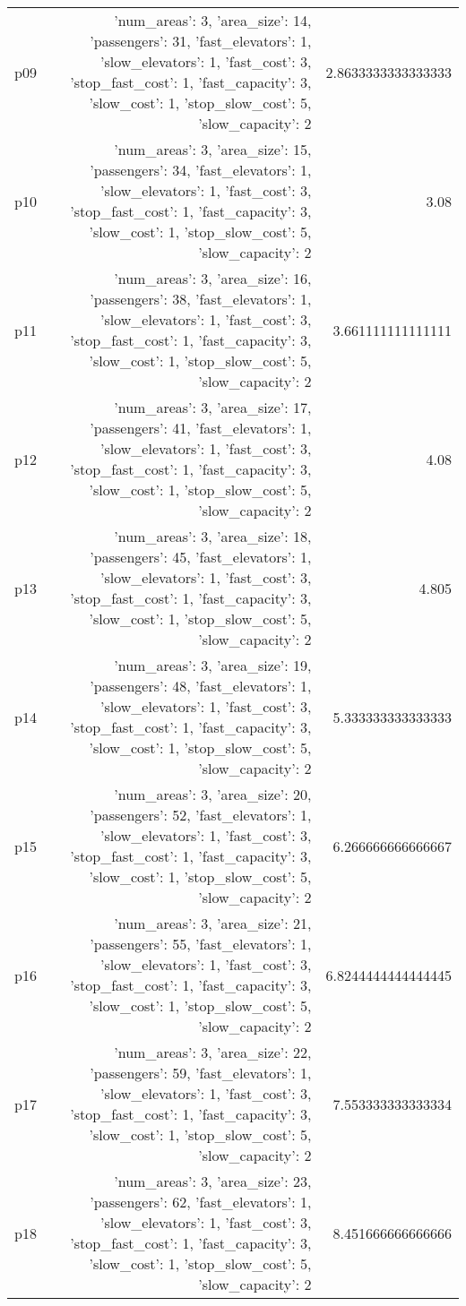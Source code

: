 \documentclass{article}
\begin{document}
\begin{center}
\begin{tabular}{r|r|r}
  p09&{'num\_areas': 3, 'area\_size': 14, 'passengers': 31, 'fast\_elevators': 1, 'slow\_elevators': 1, 'fast\_cost': 3, 'stop\_fast\_cost': 1, 'fast\_capacity': 3, 'slow\_cost': 1, 'stop\_slow\_cost': 5, 'slow\_capacity': 2}&2.8633333333333333\\
  p10&{'num\_areas': 3, 'area\_size': 15, 'passengers': 34, 'fast\_elevators': 1, 'slow\_elevators': 1, 'fast\_cost': 3, 'stop\_fast\_cost': 1, 'fast\_capacity': 3, 'slow\_cost': 1, 'stop\_slow\_cost': 5, 'slow\_capacity': 2}&3.08\\
  p11&{'num\_areas': 3, 'area\_size': 16, 'passengers': 38, 'fast\_elevators': 1, 'slow\_elevators': 1, 'fast\_cost': 3, 'stop\_fast\_cost': 1, 'fast\_capacity': 3, 'slow\_cost': 1, 'stop\_slow\_cost': 5, 'slow\_capacity': 2}&3.661111111111111\\
  p12&{'num\_areas': 3, 'area\_size': 17, 'passengers': 41, 'fast\_elevators': 1, 'slow\_elevators': 1, 'fast\_cost': 3, 'stop\_fast\_cost': 1, 'fast\_capacity': 3, 'slow\_cost': 1, 'stop\_slow\_cost': 5, 'slow\_capacity': 2}&4.08\\
  p13&{'num\_areas': 3, 'area\_size': 18, 'passengers': 45, 'fast\_elevators': 1, 'slow\_elevators': 1, 'fast\_cost': 3, 'stop\_fast\_cost': 1, 'fast\_capacity': 3, 'slow\_cost': 1, 'stop\_slow\_cost': 5, 'slow\_capacity': 2}&4.805\\
  p14&{'num\_areas': 3, 'area\_size': 19, 'passengers': 48, 'fast\_elevators': 1, 'slow\_elevators': 1, 'fast\_cost': 3, 'stop\_fast\_cost': 1, 'fast\_capacity': 3, 'slow\_cost': 1, 'stop\_slow\_cost': 5, 'slow\_capacity': 2}&5.333333333333333\\
  p15&{'num\_areas': 3, 'area\_size': 20, 'passengers': 52, 'fast\_elevators': 1, 'slow\_elevators': 1, 'fast\_cost': 3, 'stop\_fast\_cost': 1, 'fast\_capacity': 3, 'slow\_cost': 1, 'stop\_slow\_cost': 5, 'slow\_capacity': 2}&6.266666666666667\\
  p16&{'num\_areas': 3, 'area\_size': 21, 'passengers': 55, 'fast\_elevators': 1, 'slow\_elevators': 1, 'fast\_cost': 3, 'stop\_fast\_cost': 1, 'fast\_capacity': 3, 'slow\_cost': 1, 'stop\_slow\_cost': 5, 'slow\_capacity': 2}&6.8244444444444445\\
  p17&{'num\_areas': 3, 'area\_size': 22, 'passengers': 59, 'fast\_elevators': 1, 'slow\_elevators': 1, 'fast\_cost': 3, 'stop\_fast\_cost': 1, 'fast\_capacity': 3, 'slow\_cost': 1, 'stop\_slow\_cost': 5, 'slow\_capacity': 2}&7.553333333333334\\
  p18&{'num\_areas': 3, 'area\_size': 23, 'passengers': 62, 'fast\_elevators': 1, 'slow\_elevators': 1, 'fast\_cost': 3, 'stop\_fast\_cost': 1, 'fast\_capacity': 3, 'slow\_cost': 1, 'stop\_slow\_cost': 5, 'slow\_capacity': 2}&8.451666666666666\\

\end{tabular}
\end{center}
\end{document}

